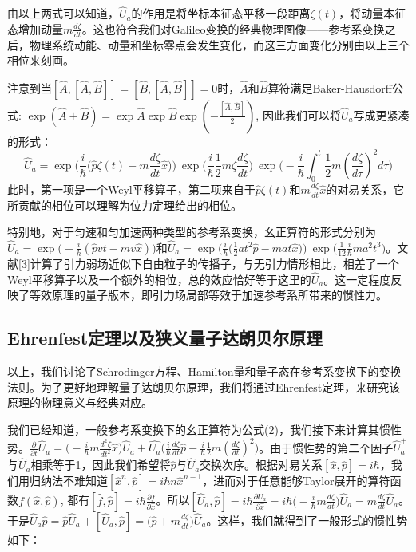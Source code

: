 \documentclass[a4paper]{article}
\begin{document}
        由以上两式可以知道，$\hat{U}_a$的作用是将坐标本征态平移一段距离$\zeta(t)$，将动量本征态增加动量$m\frac{d \zeta}{dt}$。这也符合我们对Galileo变换的经典物理图像——参考系变换之后，物理系统动能、动量和坐标零点会发生变化，而这三方面变化分别由以上三个相位来刻画。

        注意到当$[\hat{A}, [\hat{A}, \hat{B}]]=[\hat{B}, [\hat{A}, \hat{B}]]=0$时，$\hat{A}$和$\hat{B}$算符满足Baker-Hausdorff公式: $\exp(\hat{A}+\hat{B})=\exp\hat{A} \exp\hat{B} \exp(-\frac{[\hat{A}, \hat{B}]}{2})$, 因此我们可以将$\hat{U}_a$写成更紧凑的形式：
        \begin{equation}
            \hat{U}_a=\exp\bigg(\frac{i}{\hbar}\bigg(\hat{p}\zeta(t)-m\frac{d\zeta}{dt}\hat{x} \bigg) \bigg)\ \exp\bigg(\frac{i}{\hbar}\frac{1}{2}m\zeta\frac{d\zeta}{dt} \bigg)\ \exp\bigg(-\frac{i}{\hbar}\int_0^t\frac{1}{2}m(\frac{d \zeta}{d\tau})^2 d\tau \bigg)
        \end{equation}
        此时，第一项是一个Weyl平移算子，第二项来自于$\hat{p}\zeta(t)$和$m\frac{d\zeta}{dt}\hat{x}$的对易关系，它所贡献的相位可以理解为位力定理给出的相位。
        
        特别地，对于匀速和匀加速两种类型的参考系变换，幺正算符的形式分别为$\hat{U}_a=\exp\big(-\frac{i}{h}(\hat{p}vt-mv\hat{x})\big)$和$\hat{U}_a=\exp\big(\frac{i}{\hbar}\big(\frac{1}{2}at^2\hat{p}-mat\hat{x} \big)\big)\ \exp\big(\frac{1}{12}\frac{i}{\hbar}ma^2t^3\big)$。文献[3]计算了引力弱场近似下自由粒子的传播子，与无引力情形相比，相差了一个Weyl平移算子以及一个额外的相位，总的效应恰好等于这里的$\hat{U}_a$。这一定程度反映了等效原理的量子版本，即引力场局部等效于加速参考系所带来的惯性力。

    \subsection{Ehrenfest定理以及狭义量子达朗贝尔原理}

        以上，我们讨论了Schrodinger方程、Hamilton量和量子态在参考系变换下的变换法则。为了更好地理解量子达朗贝尔原理，我们将通过Ehrenfest定理，来研究该原理的物理意义与经典对应。

        我们已经知道，一般参考系变换下的幺正算符为公式(2)，我们接下来计算其惯性势。$\frac{\partial}{\partial t}\hat{U}_a = \big(-\frac{i}{\hbar}m\frac{d^2 \zeta}{dt^2} \hat{x}\big)\hat{U}_a + \hat{U_a}\big(\frac{i}{\hbar}\frac{d\zeta}{dt}\hat{p} - \frac{i}{\hbar}\frac{1}{2}m(\frac{d\zeta}{dt})^2\big)$。由于惯性势的第二个因子$\hat{U}_a^+$与$\hat{U}_a$相乘等于1，因此我们希望将$\hat{p}$与$\hat{U}_a$交换次序。根据对易关系$[\hat{x},\hat{p}]=i\hbar$，我们用归纳法不难知道$[\hat{x}^n,\hat{p}]=i\hbar n\hat{x}^{n-1}$，进而对于任意能够Taylor展开的算符函数$f(\hat{x},\hat{p})$, 都有$[\hat{f}, \hat{p}]=i\hbar\frac{\partial f}{\partial\hat{x}}$。所以$[\hat{U}_a, \hat{p}] = i\hbar\frac{\partial\hat{U}_a}{\partial\hat{x}} = i\hbar\big(-\frac{i}{\hbar}m\frac{d\zeta}{dt}\big)\hat{U}_a = m\frac{d\zeta}{dt}\hat{U}_a$。于是$\hat{U}_a\hat{p} = \hat{p}\hat{U}_a + [\hat{U}_a, \hat{p}] = \big(\hat{p}+m\frac{d\zeta}{dt}\big)\hat{U}_a$。这样，我们就得到了一般形式的惯性势如下：
\end{document}
